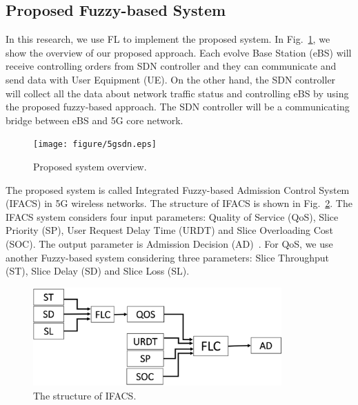 \documentclass[graybox]{svmult}
\begin{document}
\subsection{Proposed Fuzzy-based System}\label{sec:proposed}
In this research, we use FL to implement the proposed system. In Fig.~\ref{fig:PSA}, we show the overview of our proposed approach. Each evolve Base Station (eBS) will receive controlling orders from SDN controller and they can communicate and send data with User Equipment (UE). On the other hand, the SDN controller will collect all the data about network traffic status and controlling eBS by using the proposed fuzzy-based approach. The SDN controller will be a communicating bridge between eBS and 5G core network.
\begin{figure}[h]\centering
	\texttt{[image: figure/5gsdn.eps]}
	\caption{Proposed system overview.}\label{fig:PSA}
\end{figure}

The proposed system is called Integrated Fuzzy-based Admission Control System (IFACS) in 5G wireless networks. The structure of IFACS is shown in Fig.~\ref{fig:IFACS}. The IFACS system considers four input parameters: Quality of Service (QoS), Slice Priority (SP), User Request Delay Time (URDT) and Slice Overloading Cost (SOC). The output parameter is Admission Decision (AD)~\cite{AMPRIRIT2021100351}. For QoS, we use another Fuzzy-based system considering three parameters: Slice Throughput (ST), Slice Delay (SD) and Slice Loss (SL).

\begin{figure}[h]\centering
	\includegraphics[width=0.85\textwidth]{figure/IFACS.eps}
	\caption{The structure of IFACS.}\label{fig:IFACS}
\end{figure}
\end{document}
